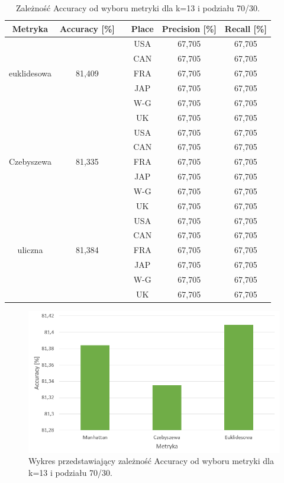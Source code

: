 \documentclass{classrep}
\begin{document}
\begin{table}[h!]
	\centering
	\begin{tabular} {c c c c c c}
		\hline
		\textbf{Metryka} & \textbf{Accuracy [\%]} & \vline & \textbf{Place} & \textbf{Precision [\%]} & \textbf{Recall [\%]}\\ [0.5ex] 
		\hline
		\hline
		&   					&\vline& USA & 67,705 & 67,705 \\
		&						&\vline& CAN & 67,705 & 67,705 \\
		euklidesowa & 81,409    &\vline& FRA & 67,705 & 67,705 \\
		&						&\vline& JAP & 67,705 & 67,705 \\
		&						&\vline& W-G & 67,705 & 67,705 \\
		&		 				&\vline& UK  & 67,705 & 67,705 \\
		\hline 
		&   					&\vline& USA & 67,705 & 67,705 \\
		&						&\vline& CAN & 67,705 & 67,705 \\
		Czebyszewa & 81,335     &\vline& FRA & 67,705 & 67,705 \\
		&						&\vline& JAP & 67,705 & 67,705 \\
		&						&\vline& W-G & 67,705 & 67,705 \\
		&		 				&\vline& UK  & 67,705 & 67,705 \\
		\hline 
		&   					&\vline& USA & 67,705 & 67,705 \\
		&						&\vline& CAN & 67,705 & 67,705 \\
		uliczna & 81,384        &\vline& FRA & 67,705 & 67,705 \\
		&						&\vline& JAP & 67,705 & 67,705 \\
		&						&\vline& W-G & 67,705 & 67,705 \\
		&		 				&\vline& UK  & 67,705 & 67,705 \\
		\hline
		\hline
	\end{tabular}
	\caption{Zależność Accuracy od wyboru metryki dla k=13 i podziału 70/30. }
	\label{tabelaMetric}
\end{table}

\begin{figure}[h!]
    \centering
    \includegraphics[width=1\textwidth]{accuracyMetric.png}
    \caption{Wykres przedstawiający zależność Accuracy od wyboru metryki dla k=13 i podziału 70/30.}
    \label{accuracyMetric}
\end{figure}
\end{document}
